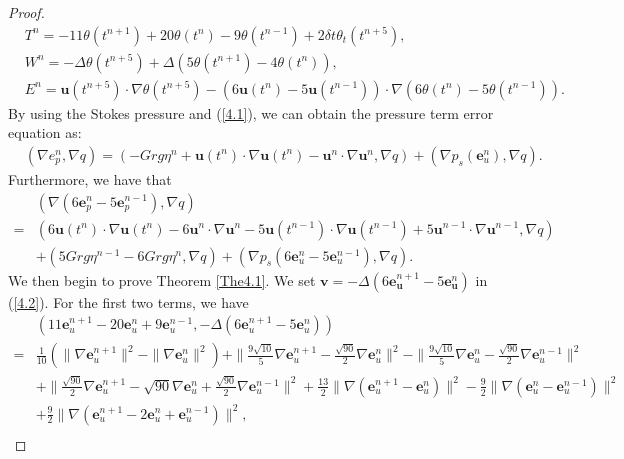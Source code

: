 \documentclass[10pt]{article}
\begin{document}
\begin{proof}
		\begin{align}
			&T^n=-11\theta(t^{n+1})+20\theta(t^{n})-9\theta(t^{n-1})+2\delta t\theta_t(t^{n+5}),\\
			&W^n=-\Delta\theta(t^{n+5})+\Delta(5\theta(t^{n+1})-4\theta(t^{n})),\label{4.10}\\
			&{ E^n=\bm{u}(t^{n+5})\cdot\nabla\theta(t^{n+5})-(6\bm{u}(t^{n})-5\bm{u}(t^{n-1}))\cdot\nabla(6\theta(t^{n})-5\theta(t^{n-1})).}
		\end{align}
		By using the Stokes pressure and (\ref{4.1}), we can obtain the pressure term error equation as:
		\begin{align}\label{4.12}
			&(\nabla e_p^n,\nabla q)=(-Grg\eta^n+\bm{u}(t^{n})\cdot\nabla\bm{u}(t^{n})-\bm{u}^{n}\cdot\nabla\bm{u}^{n},\nabla q)+(\nabla p_s(\bm{e}_u^n),\nabla q).
		\end{align}
		Furthermore, we have that
		\begin{align}\label{4.13}
			& (\nabla (6\bm{e}_p^n-5\bm{e}_p^{n-1}),\nabla q)\\=&(6\bm{u}(t^n)\cdot\nabla\bm{u}(t^n)-6\bm{u}^n\cdot\nabla\bm{u}^n-5\bm{u}(t^{n-1})\cdot\nabla\bm{u}(t^{n-1})+5\bm{u}^{n-1}\cdot\nabla\bm{u}^{n-1},\nabla q)\nonumber\\
			&+(5Grg\eta^{n-1}-6Grg\eta^n,\nabla q)+(\nabla p_s(6\bm{e}_u^n-5\bm{e}_u^{n-1}),\nabla q).\nonumber
		\end{align}
		We then begin to prove Theorem \ref{The4.1}. We set \( \bm{v} = -\Delta(6\bm{e}_{\bm{u}}^{n+1} - 5\bm{e}_{\bm{u}}^n) \) in (\ref{4.2}). For the first two terms, we have
		\begin{align}\label{4.14}
			&(11\bm{e}_u^{n+1} - 20\bm{e}_u^n + 9\bm{e}_u^{n-1}, 
			-\Delta(6\bm{e}_u^{n+1} - 5\bm{e}_u^n))\\
			= &\frac{1}{10} (\|\nabla \bm{e}_u^{n+1}\|^2-\|\nabla \bm{e}_u^{n}\|^2 )
			+ \|\frac{9\sqrt{10}}{5} \nabla \bm{e}_u^{n+1}-\frac{\sqrt{90}}{2} \nabla \bm{e}_u^n\|^2 
			- \|\frac{9\sqrt{10}}{5} \nabla \bm{e}_u^{n}-\frac{\sqrt{90}}{2} \nabla \bm{e}_u^{n-1}\|^2  \nonumber\\
			&+\|\frac{\sqrt{90}}{2} \nabla \bm{e}_u^{n+1}-\sqrt{90} \nabla \bm{e}_u^n+\frac{\sqrt{90}}{2} \nabla \bm{e}_u^{n-1}\|^2+\frac{13}{2}\|\nabla(\bm{e}_u^{n+1}-\bm{e}_u^n)\|^2- \frac{9}{2} \|\nabla (\bm{e}_u^n - \bm{e}_u^{n-1})\|^2 \nonumber\\
			&+ \frac{9}{2} \|\nabla (\bm{e}_u^{n+1} - 2\bm{e}_u^n + \bm{e}_u^{n-1})\|^2,
			\nonumber
		\end{align}
		\begin{align}

\end{align}
\end{proof}
\end{document}
